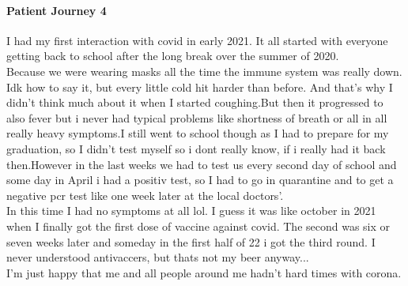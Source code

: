 \paragraph{Patient Journey 4}\label{apx:pj4}
I had my first interaction with covid in early 2021. It all started with everyone getting back to school after the long break over the summer of 2020.\\
Because we were wearing masks all the time the immune system was really down. Idk how to say it, but every little cold hit harder than before. And that's why I didn't think much about it when I started coughing.But then it progressed to also fever but i never had typical problems like shortness of breath or all in all really heavy symptoms.I still went to school though as I had to prepare for my graduation, so I didn't test myself so i dont really know, if i really had it back then.However in the last weeks we had to test us every second day of school and some day in April i had a positiv test, so I had to go in quarantine and to get a negative pcr test like one week later at the local doctors'.\\
In this time I had no symptoms at all lol. I guess it was like october in 2021 when I finally got the first dose of vaccine against covid. The second was six or seven weeks later and someday in the first half of 22 i got the third round. I never understood antivaccers, but thats not my beer anyway...\\
I'm just happy that me and all people around me hadn't hard times with corona.
